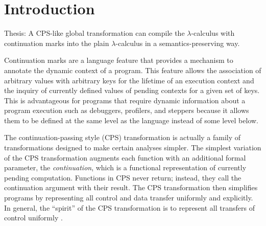 \documentclass[ms]{byuprop}
\title{\Title}
\author{\Author}
\begin{document}
\maketitle



\section{Introduction}


Thesis: A CPS-like global transformation can compile the $\lambda$-calculus with
continuation marks into the plain $\lambda$-calculus in a semantics-preserving way.

Continuation marks \cite{clements2006portable} are a language feature that provides a
mechanism to annotate the dynamic context of a program. This feature allows the
association of arbitrary values with arbitrary keys for the lifetime of an execution
context and the inquiry of currently defined values of pending contexts for a given set of
keys. This is advantageous for programs that require dynamic information about a program
execution such as debuggers, profilers, and steppers because it allows them to be defined
at the same level as the language instead of some level below.

The continuation-passing style (CPS) transformation is actually a family of 
transformations designed to make certain analyses simpler. The simplest variation of the 
CPS transformation augments each function with an additional formal parameter, the 
\emph{continuation}, which is a functional representation of currently pending 
computation. Functions in CPS never return; instead, they call the continuation argument 
with their result. The CPS transformation then simplifies programs by representing all 
control and data transfer uniformly and explicitly. In general, the ``spirit'' of the 
CPS transformation is to represent all transfers of control uniformly \cite{sabry1994formal}.
\end{document}
